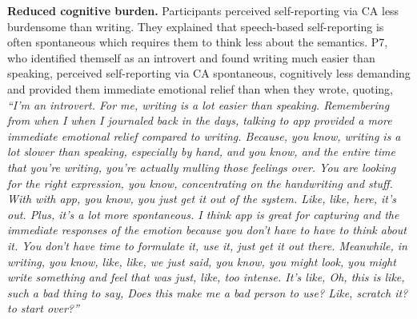          
        \textbf{Reduced cognitive burden. }
        Participants perceived self-reporting via \ac{CA} less burdensome than writing. 
        They explained that speech-based self-reporting is often spontaneous which requires them to think less about the semantics.
        P7, who identified themself as an introvert and found writing much easier than speaking, 
        perceived self-reporting via \acl{CA} spontaneous, cognitively less demanding and provided them immediate emotional relief than when they wrote, quoting,
                \textit{
                ``I'm an introvert. For me, writing is a lot easier than speaking. 
                Remembering from when I when I journaled back in the days, talking to \acl{app} provided a more immediate emotional relief compared to writing. 
                Because, you know, writing is a lot slower than speaking, especially by hand, and you know, and the entire time that you're writing, you're actually mulling those feelings over. You are looking for the right expression, you know, concentrating on the handwriting and stuff. 
                With with \acl{app}, you know, you just get it out of the system. Like, like, here, it's out. 
                Plus, it's a lot more spontaneous. 
                I think \acl{app} is great for capturing and the immediate responses of the emotion because you don't have to have to think about it. 
                You don't have time to formulate it, use it, just get it out there. Meanwhile, in writing, you know, like, like, we just said, you know, you might look, you might write something and feel that was just, like, too intense. 
                It's like, Oh, this is like, such a bad thing to say, Does this make me a bad person to use? Like, scratch it? to start over?''
                }
